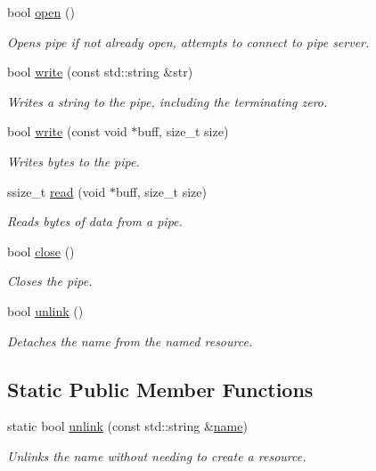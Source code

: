 \begin{DoxyCompactItemize}
bool \hyperlink{classcpen333_1_1process_1_1posix_1_1pipe_a256fbc6e54cf558ee06c5f3b65d5dc23}{open} ()
\begin{DoxyCompactList}\small\item\em Opens pipe if not already open, attempts to connect to pipe server. \end{DoxyCompactList}\item 
bool \hyperlink{classcpen333_1_1process_1_1posix_1_1pipe_a6aeb644645944b435c32928db1349aa7}{write} (const std\+::string \&str)
\begin{DoxyCompactList}\small\item\em Writes a string to the pipe, including the terminating zero. \end{DoxyCompactList}\item 
bool \hyperlink{classcpen333_1_1process_1_1posix_1_1pipe_abb450a7e724dd5ad8fc364b2cc75c311}{write} (const void $\ast$buff, size\+\_\+t size)
\begin{DoxyCompactList}\small\item\em Writes bytes to the pipe. \end{DoxyCompactList}\item 
ssize\+\_\+t \hyperlink{classcpen333_1_1process_1_1posix_1_1pipe_af327b2c4db0cfd21cd5688ccff0f5eb0}{read} (void $\ast$buff, size\+\_\+t size)
\begin{DoxyCompactList}\small\item\em Reads bytes of data from a pipe. \end{DoxyCompactList}\item 
bool \hyperlink{classcpen333_1_1process_1_1posix_1_1pipe_af36dacdb81426f3dc76904bdcf1afc8f}{close} ()
\begin{DoxyCompactList}\small\item\em Closes the pipe. \end{DoxyCompactList}\item 
bool \hyperlink{classcpen333_1_1process_1_1posix_1_1pipe_ac1dd8e1a7fd46480b709e96190afe697}{unlink} ()
\begin{DoxyCompactList}\small\item\em Detaches the name from the named resource. \end{DoxyCompactList}\end{DoxyCompactItemize}
\subsection*{Static Public Member Functions}
\begin{DoxyCompactItemize}
\item 
static bool \hyperlink{classcpen333_1_1process_1_1posix_1_1pipe_aef89e04134417c569972bd565741622b}{unlink} (const std\+::string \&\hyperlink{classcpen333_1_1process_1_1impl_1_1named__resource__base_a53986a0a1dd26a3602b842c45613b79d}{name})
\begin{DoxyCompactList}\small\item\em Unlinks the name without needing to create a resource. \end{DoxyCompactList}\end{DoxyCompactItemize}
